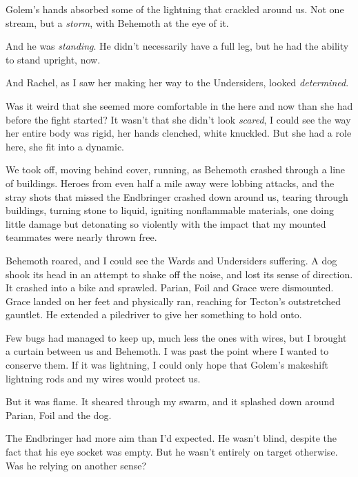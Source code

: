 Golem's hands absorbed some of the lightning that crackled around us.  Not one stream, but a \emph{storm}, with Behemoth at the eye of it.



And he was \emph{standing}.  He didn't necessarily have a full leg, but he had the ability to stand upright, now.



And Rachel, as I saw her making her way to the Undersiders, looked \emph{determined}.



Was it weird that she seemed more comfortable in the here and now than she had before the fight started?  It wasn't that she didn't look \emph{scared}, I could see the way her entire body was rigid, her hands clenched, white knuckled.  But she had a role here, she fit into a dynamic.



We took off, moving behind cover, running, as Behemoth crashed through a line of buildings.  Heroes from even half a mile away were lobbing attacks, and the stray shots that missed the Endbringer crashed down around us, tearing through buildings, turning stone to liquid, igniting nonflammable materials, one doing little damage but detonating so violently with the impact that my mounted teammates were nearly thrown free.



Behemoth roared, and I could see the Wards and Undersiders suffering.  A dog shook its head in an attempt to shake off the noise, and lost its sense of direction.  It crashed into a bike and sprawled.  Parian, Foil and Grace were dismounted.  Grace landed on her feet and physically ran, reaching for Tecton's outstretched gauntlet.  He extended a piledriver to give her something to hold onto.



Few bugs had managed to keep up, much less the ones with wires, but I brought a curtain between us and Behemoth.  I was past the point where I wanted to conserve them.  If it was lightning, I could only hope that Golem's makeshift lightning rods and my wires would protect us.



But it was flame.  It sheared through my swarm, and it splashed down around Parian, Foil and the dog.



The Endbringer had more aim than I'd expected.  He wasn't blind, despite the fact that his eye socket was empty.  But he wasn't entirely on target otherwise.  Was he relying on another sense?



